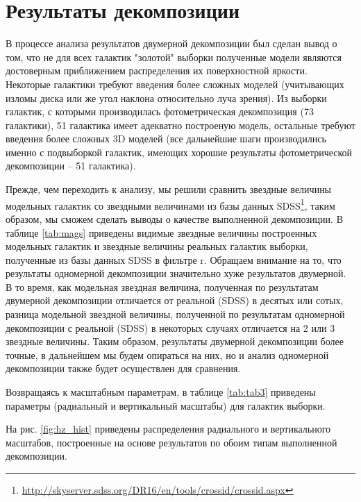 \section{Результаты декомпозиции}
В процессе анализа результатов двумерной декомпозиции был сделан вывод о том, что не для всех галактик "золотой"\textrm{ } выборки полученные модели являются достоверным приближением распределения их поверхностной яркости. Некоторые галактики требуют введения более сложных моделей (учитывающих изломы диска  или же угол наклона относительно луча зрения). Из выборки  галактик, с которыми производилась фотометрическая декомпозиция (73 галактики), 51 галактика имеет адекватно построеную модель, остальные требуют введения более сложных 3D моделей (все дальнейшие шаги производились именно с подвыборкой галактик, имеющих хорошие результаты фотометрической декомпозиции -- 51 галактика). 

Прежде, чем переходить к анализу, мы решили сравнить звездные величины модельных галактик со звездными величинами из базы данных SDSS\footnote{\url{http://skyserver.sdss.org/DR16/en/tools/crossid/crossid.aspx}}, таким образом, мы сможем сделать выводы о качестве выполненной декомпозиции. В таблице \ref{tab:mags} приведены видимые звездные величины построенных модельных галактик и звездные величины реальных галактик выборки, полученные из базы данных SDSS в фильтре r. 
 Обращаем внимание на то, что результаты одномерной декомпозиции значительно хуже результатов двумерной. В то время, как модельная звездная величина, полученная по результатам двумерной декомпозиции отличается от реальной (SDSS) в десятых или сотых,  разница модельной звездной величины, полученной по результатам одномерной декомпозиции с реальной (SDSS) в некоторых случаях отличается на 2 или 3 звездные величины. Таким образом, результаты двумерной декомпозиции более точные, в дальнейшем мы будем опираться на них, но и анализ одномерной декомпозиции также будет осуществлен для сравнения.

Возвращаясь к масштабным параметрам, в таблице \ref{tab:tab3} приведены параметры (радиальный и вертикальный масштабы) для галактик выборки.

На рис. \ref{fig:hz_hist} приведены распределения радиального и вертикального масштабов, построенные на основе результатов по обоим типам выполненной декомпозиции. 

